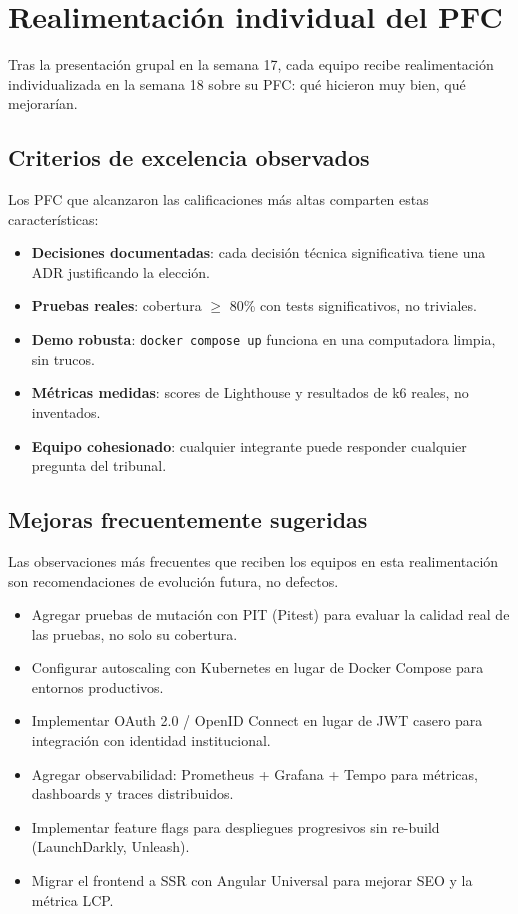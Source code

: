 \section{Realimentación individual del PFC}

Tras la presentación grupal en la semana 17, cada equipo
recibe realimentación individualizada en la semana 18 sobre su
PFC: qué hicieron muy bien, qué mejorarían.


\subsection{Criterios de excelencia observados}

Los PFC que alcanzaron las calificaciones más altas comparten estas
características:

\begin{itemize}
\item \textbf{Decisiones documentadas}: cada decisión técnica
significativa tiene una ADR justificando la elección.
\item \textbf{Pruebas reales}: cobertura $\geq$ 80\% con tests
significativos, no triviales.
\item \textbf{Demo robusta}: \texttt{docker compose up} funciona en
una computadora limpia, sin trucos.
\item \textbf{Métricas medidas}: scores de Lighthouse y resultados de
k6 reales, no inventados.
\item \textbf{Equipo cohesionado}: cualquier integrante puede
responder cualquier pregunta del tribunal.
\end{itemize}

\subsection{Mejoras frecuentemente sugeridas}

Las observaciones más frecuentes que reciben los equipos
en esta realimentación son recomendaciones de evolución futura,
no defectos.


\begin{itemize}
\item Agregar pruebas de mutación con PIT (Pitest) para evaluar la
calidad real de las pruebas, no solo su cobertura.
\item Configurar autoscaling con Kubernetes en lugar de Docker
Compose para entornos productivos.
\item Implementar OAuth 2.0 / OpenID Connect en lugar de JWT casero
para integración con identidad institucional.
\item Agregar observabilidad: Prometheus + Grafana + Tempo para
métricas, dashboards y traces distribuidos.
\item Implementar feature flags para despliegues progresivos sin
re-build (LaunchDarkly, Unleash).
\item Migrar el frontend a SSR con Angular Universal para mejorar
SEO y la métrica LCP.
\end{itemize}

